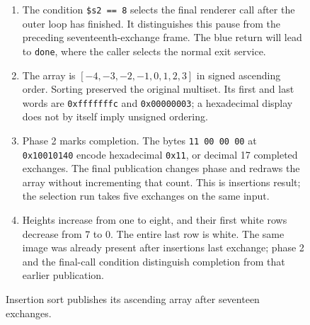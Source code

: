 \begin{figure}[htbp]
  \par\smallskip
  \begin{minipage}{\linewidth}
    \small
    \begin{enumerate}
      \item The condition \texttt{\$s2 == 8} selects the final renderer call after the outer loop has finished. It distinguishes this pause from the preceding seventeenth-exchange frame. The blue return will lead to \texttt{done}, where the caller selects the normal exit service.
      \item The array is $[-4,-3,-2,-1,0,1,2,3]$ in signed ascending order. Sorting preserved the original multiset. Its first and last words are \texttt{0xfffffffc} and \texttt{0x00000003}; a hexadecimal display does not by itself imply unsigned ordering.
      \item Phase 2 marks completion. The bytes \texttt{11 00 00 00} at \texttt{0x10010140} encode hexadecimal \texttt{0x11}, or decimal 17 completed exchanges. The final publication changes phase and redraws the array without incrementing that count. This is insertion\textquotesingle s result; the selection run takes five exchanges on the same input.
      \item Heights increase from one to eight, and their first white rows decrease from 7 to 0. The entire last row is white. The same image was already present after insertion\textquotesingle s last exchange; phase 2 and the final-call condition distinguish completion from that earlier publication.
    \end{enumerate}
  \end{minipage}
  \caption{Insertion sort publishes its ascending array after seventeen exchanges.}
  \label{capture:009-sorting-visualizer-f04-final}
\end{figure}
\par
